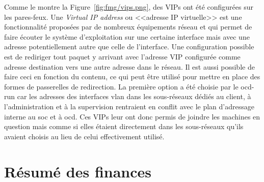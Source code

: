 \documentclass[12pt, oneside, a4paper, titlepage]{report}
\begin{document}
Comme le montre la Figure~\ref{fig:fmg/vips.png}, des VIPs ont été configurées
sur les pares-feux. Une \textit{Virtual IP address} ou <<adresse IP virtuelle>>
est une fonctionnalité proposées par de nombreux équipements réseau et qui
permet de faire écouter le système d'exploitation sur une certaine interface
mais avec une adresse potentiellement autre que celle de l'interface. Une
configuration possible est de rediriger tout paquet y arrivant avec l'adresse
VIP configurée comme adresse destination vers une autre adresse dans le réseau.
Il est aussi possible de faire ceci en fonction du contenu, ce qui peut être
utilisé pour mettre en place des formes de passerelles de redirection. La
première option a été choisie par le \gls{ocd-run} car les adresses des
interfaces \gls{vlan} dans les sous-réseaux dédiés au client, à l'administration
et à la supervision rentraient en conflit avec le plan d'adressage interne au
\gls{soc} et à \gls{ocd}. Ces VIPs leur ont donc permis de joindre les machines
en question mais comme si elles étaient directement dans les sous-réseaux qu'ils
avaient choisis au lieu de celui effectivement utilisé.

\section{Résumé des finances}%
\label{sec:annexes::finances-ocd}
\end{document}

